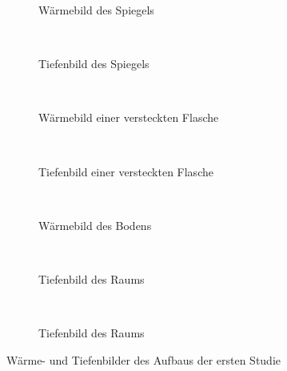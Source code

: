 \begin{figure}[t]
	\centering
	\begin{subfigure}[t]{0.45\textwidth}
		\centering
		\caption{Wärmebild des Spiegels}
		\label{fig:study1_heat2}
	\end{subfigure}
	~
	\begin{subfigure}[t]{0.45\textwidth}
		\centering
		\caption{Tiefenbild des Spiegels}
		\label{fig:study1_depth2}
	\end{subfigure}
	~
	\begin{subfigure}[t]{0.45\textwidth}
		\centering
		\caption{Wärmebild einer versteckten Flasche}
		\label{fig:study1_heat3}
	\end{subfigure}
	~
	\begin{subfigure}[t]{0.45\textwidth}
		\centering
		\caption{Tiefenbild einer versteckten Flasche}
		\label{fig:study1_depth3}
	\end{subfigure}
	~
	\begin{subfigure}[t]{0.45\textwidth}
		\centering
		\caption{Wärmebild des Bodens}
		\label{fig:study1_heat4}
	\end{subfigure}
	~
	\begin{subfigure}[t]{0.45\textwidth}
		\centering
		\caption{Tiefenbild des Raums}
		\label{fig:study1_depth4}
	\end{subfigure}
	~
	\begin{subfigure}[t]{0.45\textwidth}
		\centering
		\caption{Tiefenbild des Raums}
		\label{fig:study1_depth5}
	\end{subfigure}
	\caption{Wärme- und Tiefenbilder des Aufbaus der ersten Studie}
	\label{fig:study1_modes1}
\end{figure}
 
